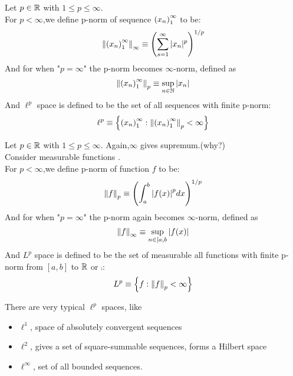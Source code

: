 \begin{definition}\rm\nextline
	Let $p\in\mathbb{R}$ with $1\leq p\leq\infty$. \\
	For $p<\infty$,we define p-norm of sequence $\left({x_n}\right)_1^\infty$ to be:
	$$
		\left\|{\left({x_n}\right)_1^\infty}\right\|_\infty\equiv\left(\sum_{s=1}^\infty|x_n|^p\right)^{1/p}
	$$
	And for when "$p=\infty$" the p-norm becomes $\infty$-norm, defined as
	$$
		\left\|{\left({x_n}\right)_1^\infty}\right\|_p\equiv\sup_{n\in\mathbb{N}}|x_n|
	$$
	And $\ell^p$ space is defined to be the set of all sequences with finite p-norm:
	$$
		\ell^p\equiv\left\{\left({x_n}\right)_1^\infty:\left\|{\left({x_n}\right)_1^\infty}\right\|_p<\infty\right\}
	$$
\end{definition}

\begin{definition}\rm\nextline
	Let $p\in\mathbb{R}$ with $1\leq p\leq\infty$. Again,$\infty$ gives supremum.(why?)\\
	Consider measurable functions .\\
	For $p<\infty$,we define p-norm of function $f$ to be:
	$$
		\left\|{f}\right\|_p\equiv\left(\int_a^b{|f(x)|}^p dx \right)^{1/p}
	$$
	And for when "$p=\infty$" the p-norm again becomes $\infty$-norm, defined as
	$$
		\left\|{f}\right\|_\infty\equiv\sup_{n\in[a,b}|f(x)|
	$$
	And $L^p$ space is defined to be the set of measurable all functions with finite p-norm from $[a,b]$ to $\mathbb{R}$ or $\comp$:
	$$
		L^p\equiv\left\{f:\left\|{f}\right\|_p<\infty\right\}
	$$
\end{definition}

\begin{remark}\rm\nextline
	There are very typical $\ell^p$ spaces, like
	\begin{itemize}
		\item $\ell^1$, space of absolutely convergent sequences
		\item $\ell^2$, gives a set of square-summable sequences, forms a Hilbert space
		\item $\ell^\infty$, set of all bounded sequences.
	\end{itemize}

\end{remark}